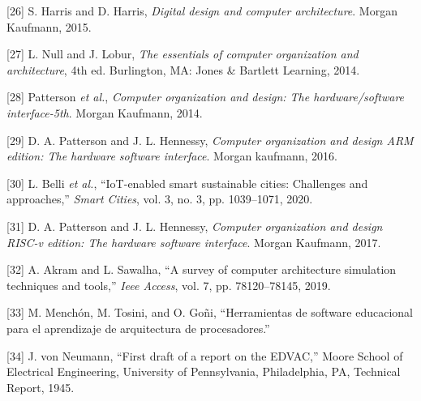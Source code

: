 \documentclass[12pt,oneside]{templates/unerthesis}
\newcommand{\CSLLeftMargin}[1]{#1} %
\newcommand{\CSLRightInline}[1]{#1} %
\newlength{\cslhangindent}
\newenvironment{CSLReferences}[2] %
 {\setlength{\parindent}{0pt}%
  \setlength{\leftskip}{#1 pt\relax}%
  \setlength{\parskip}{#2 pt\relax}%
  \everypar{\setlength{\hangindent}{\cslhangindent}}}
 {\par}
\begin{document}
\begin{CSLReferences}{0}{0}
\leavevmode{}%
\CSLLeftMargin{{[}26{]} }%
\CSLRightInline{S. Harris and D. Harris, \emph{Digital design and computer architecture}. Morgan Kaufmann, 2015.}

\leavevmode{}%
\CSLLeftMargin{{[}27{]} }%
\CSLRightInline{L. Null and J. Lobur, \emph{The essentials of computer organization and architecture}, 4th ed. Burlington, MA: Jones \& Bartlett Learning, 2014.}

\leavevmode{}%
\CSLLeftMargin{{[}28{]} }%
\CSLRightInline{Patterson \emph{et al.}, \emph{Computer organization and design: The hardware/software interface-5th}. Morgan Kaufmann, 2014.}

\leavevmode{}%
\CSLLeftMargin{{[}29{]} }%
\CSLRightInline{D. A. Patterson and J. L. Hennessy, \emph{Computer organization and design ARM edition: The hardware software interface}. Morgan kaufmann, 2016.}

\leavevmode{}%
\CSLLeftMargin{{[}30{]} }%
\CSLRightInline{L. Belli \emph{et al.}, {``IoT-enabled smart sustainable cities: Challenges and approaches,''} \emph{Smart Cities}, vol. 3, no. 3, pp. 1039--1071, 2020.}

\leavevmode{}%
\CSLLeftMargin{{[}31{]} }%
\CSLRightInline{D. A. Patterson and J. L. Hennessy, \emph{Computer organization and design RISC-v edition: The hardware software interface}. Morgan Kaufmann, 2017.}

\leavevmode{}%
\CSLLeftMargin{{[}32{]} }%
\CSLRightInline{A. Akram and L. Sawalha, {``A survey of computer architecture simulation techniques and tools,''} \emph{Ieee Access}, vol. 7, pp. 78120--78145, 2019.}

\leavevmode{}%
\CSLLeftMargin{{[}33{]} }%
\CSLRightInline{M. Menchón, M. Tosini, and O. Goñi, {``Herramientas de software educacional para el aprendizaje de arquitectura de procesadores.''}}

\leavevmode{}%
\CSLLeftMargin{{[}34{]} }%
\CSLRightInline{J. von Neumann, {``First draft of a report on the {EDVAC},''} Moore School of Electrical Engineering, University of Pennsylvania, Philadelphia, PA, Technical Report, 1945.}


\end{CSLReferences}
\end{document}
